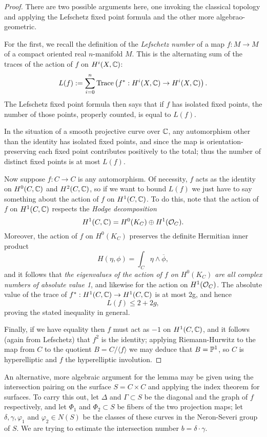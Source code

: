 \begin{proof}
There are two possible arguments here, one invoking the classical topology and applying the Lefschetz fixed point formula and the other more algebrao-geometric.

For the first, we recall the definition of the \emph{Lefschetz number} of a map $f : M \to M$ of a compact oriented real $n$-manifold $M$. This is the alternating sum of the traces of the action of $f$ on $H^i(X,\CC)$:
$$
L(f) := \sum_{i=0}^n {\rm Trace}\left(f^* : H^i(X,\CC) \to H^i(X,\CC)\right).
$$
The Lefschetz fixed point formula then says that if $f$ has isolated fixed points, the number of those points, properly counted, is equal to $L(f)$.

In the situation of a smooth projective curve over $\CC$, any automorphism other than the identity has isolated fixed points, and since the map is orientation-preserving each fixed point contributes positively to the total; thus the number of distinct fixed points is at most $L(f)$.

Now suppose $f: C \to C$ is any automorphism. Of necessity, $f$ acts as the identity on $H^0(C, \CC)$ and $H^2(C, \CC)$, so if we want to bound $L(f)$ we just have to say something about the action of $f$ on $H^1(C,\CC)$. To do this, note that the action of $f$ on $H^1(C,\CC)$ respects the \emph{Hodge decomposition}
$$
H^1(C,\CC)  = H^0(K_C) \oplus H^1(\cO_C).
$$  
Moreover, the action of $f$ on $H^0(K_C)$ preserves the definite Hermitian inner product
$$
H(\eta, \phi) = \int_C \eta \wedge \overline \phi,
$$
and it follows that \emph{the eigenvalues of the action of $f$ on $H^0(K_C)$ are all complex numbers of absolute value 1}, and likewise for the action on $H^1(\cO_C)$. The absolute value of the trace of $f^*: H^1(C,\CC) \to H^1(C,\CC)$ is at most 2g, and hence
$$
L(f) \leq 2 + 2g,
$$
proving the stated inequality in general.

Finally, if we have equality then $f$ must act as $-1$ on $H^1(C,\CC)$, and it follows (again from Lefschetz) that $f^2$ is the identity; applying Riemann-Hurwitz to the map from $C$ to the quotient $B = C/\langle f \rangle$ we may deduce that $B = \PP^1$, so $C$ is hyperelliptic and $f$ the hyperelliptic involution.
\end{proof}

An alternative, more algebraic argument for the lemma may be given using the intersection pairing on the surface $S = C \times C$ and applying the index theorem for surfaces. To carry this out, let $\Delta$ and $\Gamma \subset S$ be the diagonal and the graph of $f$ respectively, and let $\Phi_1$ and $\Phi_2 \subset S$ be fibers of the two projection maps; let $\delta, \gamma, \varphi_1$ and $\varphi_2 \in N(S)$ be the classes of these curves in the Neron-Severi group of $S$. We are trying to estimate the intersection number $b = \delta \cdot \gamma$.

